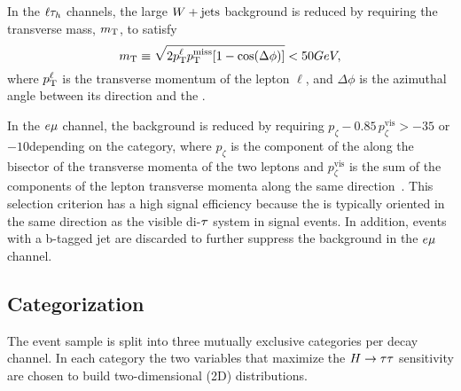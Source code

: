 In the $\ell \tau_{h}$ channels, the large $W+\text{jets}$ background is reduced by requiring the transverse mass,
$m_\mathrm{T}$, to satisfy
\begin{equation}
m_\mathrm{T} \equiv \sqrt{\smash[b]{2 p_\mathrm{T}^\ell p_\mathrm{T}^\text{miss} [1-\cos(\Delta\phi)]}} < 50GeV,
\end{equation}
where $p_\mathrm{T}^\ell$ is the transverse momentum of the lepton $\ell$,
and $\Delta\phi$ is the azimuthal angle between its direction and the \etvecmiss.

In the $e\mu$ channel, the \ttbar background is reduced by requiring $p_\zeta - 0.85 \, p_\zeta^{\text{vis}} > -35$ or $-10$\GeV depending on the category,
where $p_\zeta$ is the component of the \etvecmiss along the bisector of the transverse momenta of the two leptons
and $p_\zeta^{\text{vis}}$ is the sum of the components of the lepton transverse momenta along
the same direction~\cite{Khachatryan:2014wca}.
This selection criterion has a high signal efficiency because the \etvecmiss is typically oriented in the same direction as the visible di-$\tau$ system in signal events.
In addition, events with a b-tagged jet are discarded to further suppress the \ttbar background in the $e\mu$ channel.

\subsection{Categorization}

The event sample is split into three mutually exclusive categories per decay channel.
In each category the two variables that maximize the $H\to\tau\tau$ sensitivity are chosen to build two-dimensional (2D) distributions.

